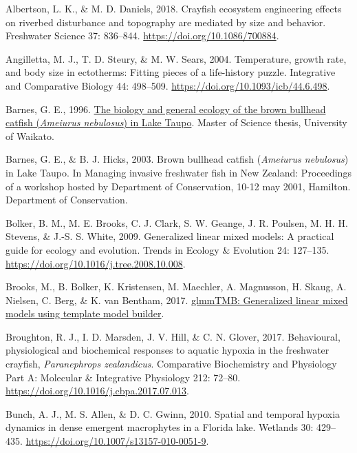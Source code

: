 \documentclass[
  letterpaper,
  DIV=11,
  numbers=noendperiod]{scrartcl}
\newlength{\cslhangindent}
\newenvironment{CSLReferences}[2] %
 {\begin{list}{}{%
  \setlength{\itemindent}{0pt}
  \setlength{\leftmargin}{0pt}
  \setlength{\parsep}{0pt}
  \ifodd #1
   \setlength{\leftmargin}{\cslhangindent}
   \setlength{\itemindent}{-1\cslhangindent}
  \fi
  \setlength{\itemsep}{#2\baselineskip}}}
 {\end{list}}
\begin{document}
\protect{}\label{refs}
\begin{CSLReferences}{0}{1}
Albertson, L. K., \& M. D. Daniels, 2018. Crayfish ecosystem engineering
effects on riverbed disturbance and topography are mediated by size and
behavior. Freshwater Science 37: 836--844.
\url{https://doi.org/10.1086/700884}.

Angilletta, M. J., T. D. Steury, \& M. W. Sears, 2004. Temperature,
growth rate, and body size in ectotherms: Fitting pieces of a
life-history puzzle. Integrative and Comparative Biology 44: 498--509.
\url{https://doi.org/10.1093/icb/44.6.498}.

Barnes, G. E., 1996.
\href{https://researchcommons.waikato.ac.nz/items/24cf02c1-8c2f-4b63-ba89-e8a509e9ba05}{The
biology and general ecology of the brown bullhead catfish
({\emph{Ameiurus nebulosus}}) in {Lake Taupo}}. Master of Science
thesis, University of Waikato.

Barnes, G. E., \& B. J. Hicks, 2003. Brown bullhead catfish
({\emph{Ameiurus nebulosus}}) in {Lake Taupo}. In Managing invasive
freshwater fish in {New Zealand}: Proceedings of a workshop hosted by
{Department of Conservation}, 10-12 may 2001, {Hamilton}. Department of
Conservation.

Bolker, B. M., M. E. Brooks, C. J. Clark, S. W. Geange, J. R. Poulsen,
M. H. H. Stevens, \& J.-S. S. White, 2009. Generalized linear mixed
models: A practical guide for ecology and evolution. Trends in Ecology
\& Evolution 24: 127--135.
\url{https://doi.org/10.1016/j.tree.2008.10.008}.

Brooks, M., B. Bolker, K. Kristensen, M. Maechler, A. Magnusson, H.
Skaug, A. Nielsen, C. Berg, \& K. van Bentham, 2017.
\href{https://doi.org/10.32614/cran.package.glmmtmb}{glmmTMB:
Generalized linear mixed models using template model builder}.

Broughton, R. J., I. D. Marsden, J. V. Hill, \& C. N. Glover, 2017.
Behavioural, physiological and biochemical responses to aquatic hypoxia
in the freshwater crayfish, {\emph{Paranephrops zealandicus}}.
Comparative Biochemistry and Physiology Part A: Molecular \& Integrative
Physiology 212: 72--80.
\url{https://doi.org/10.1016/j.cbpa.2017.07.013}.

Bunch, A. J., M. S. Allen, \& D. C. Gwinn, 2010. Spatial and temporal
hypoxia dynamics in dense emergent macrophytes in a {Florida} lake.
Wetlands 30: 429--435. \url{https://doi.org/10.1007/s13157-010-0051-9}.


\end{CSLReferences}
\end{document}
